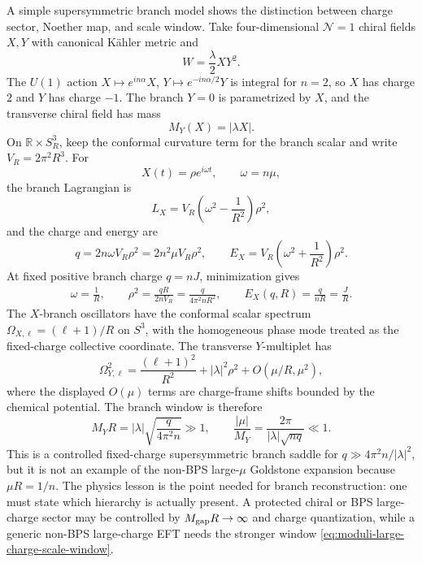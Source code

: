 A simple supersymmetric branch model shows the distinction between charge
sector, Noether map, and scale window.  Take four-dimensional
\(\mathcal N=1\) chiral fields \(X,Y\) with canonical K\"ahler metric and
\[
  W=\frac{\lambda}{2}XY^2 .
\]
The \(U(1)\) action \(X\mapsto e^{in\alpha}X\), \(Y\mapsto
e^{-in\alpha/2}Y\) is integral for \(n=2\), so \(X\) has charge \(2\) and
\(Y\) has charge \(-1\).  The branch \(Y=0\) is parametrized by \(X\), and
the transverse chiral field has mass
\[
  M_Y(X)=|\lambda X| .
\]
On \(\mathbb R\times S_R^3\), keep the conformal curvature term for the
branch scalar and write \(V_R=2\pi^2R^3\).  For
\[
  X(t)=\rho e^{i\omega t},\qquad \omega=n\mu ,
\]
the branch Lagrangian is
\[
  L_X=V_R\left(\omega^2-\frac1{R^2}\right)\rho^2 ,
\]
and the charge and energy are
\[
  q=2n\omega V_R\rho^2=2n^2\mu V_R\rho^2,\qquad
  E_X=V_R\left(\omega^2+\frac1{R^2}\right)\rho^2 .
\]
At fixed positive branch charge \(q=nJ\), minimization gives
\begin{equation}
  \label{eq:moduli-large-charge-susy-branch-example}
\begin{gathered}
  \omega=\frac1R,\qquad
  \rho^2=\frac{qR}{2nV_R}
        =\frac{q}{4\pi^2nR^2},\qquad
  E_X(q,R)=\frac{q}{nR}=\frac{J}{R}.
\end{gathered}
\end{equation}
The \(X\)-branch oscillators have the conformal scalar spectrum
\(\Omega_{X,\ell}=(\ell+1)/R\) on \(S^3\), with the homogeneous phase mode
treated as the fixed-charge collective coordinate.  The transverse
\(Y\)-multiplet has
\[
  \Omega_{Y,\ell}^2
  =
  \frac{(\ell+1)^2}{R^2}
  +|\lambda|^2\rho^2
  +O(\mu/R,\mu^2),
\]
where the displayed \(O(\mu)\) terms are charge-frame shifts bounded by the
chemical potential.  The branch window is therefore
\[
  M_YR
  =
  |\lambda|\sqrt{\frac{q}{4\pi^2 n}}\gg1,\qquad
  \frac{|\mu|}{M_Y}
  =
  \frac{2\pi}{|\lambda|\sqrt{nq}}\ll1 .
\]
This is a controlled fixed-charge supersymmetric branch saddle for
\(q\gg4\pi^2 n/|\lambda|^2\), but it is not an example of the non-BPS
large-\(\mu\) Goldstone expansion because \(\mu R=1/n\).  The physics lesson
is the point needed for branch reconstruction: one must state which
hierarchy is actually present.  A protected chiral or BPS large-charge
sector may be controlled by \(M_{\rm gap}R\to\infty\) and charge
quantization, while a generic non-BPS large-charge EFT needs the stronger
window \eqref{eq:moduli-large-charge-scale-window}.

